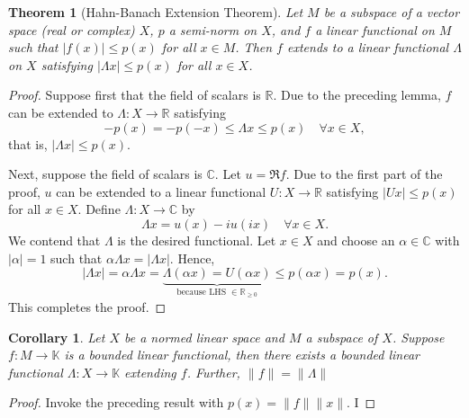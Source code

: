 \documentclass[11pt]{article}
\theoremstyle{thmstyle}
\newtheorem{theorem}{Theorem}[section]
\theoremstyle{defstyle}
\newtheorem*{corollary}{Corollary}
\newcommand{\R}{\mathbb{R}}
\newcommand{\bbC}{\mathbb{C}}
\newcommand{\K}{\mathbb{K}} %
\renewcommand{\le}{\leqslant}
\renewcommand{\ge}{\geqslant}
\begin{document}
\begin{theorem}[Hahn-Banach Extension Theorem]
    Let $M$ be a subspace of a vector space (real or complex) $X$, $p$ a semi-norm on $X$, and $f$ a linear functional on $M$ such that $|f(x)|\le p(x)$ for all $x\in M$. Then $f$ extends to a linear functional $\Lambda$ on $X$ satisfying $|\Lambda x|\le p(x)$ for all $x\in X$.
\end{theorem}
\begin{proof}
    Suppose first that the field of scalars is $\R$. Due to the preceding lemma, $f$ can be extended to $\Lambda: X\to\R$ satisfying 
    \begin{equation*}
        -p(x) = -p(-x)\le\Lambda x\le p(x)\quad\forall x\in X,
    \end{equation*}
    that is, $|\Lambda x|\le p(x)$.

    Next, suppose the field of scalars is $\bbC$. Let $u = \Re f$. Due to the first part of the proof, $u$ can be extended to a linear functional $U: X\to\R$ satisfying $|Ux|\le p(x)$ for all $x\in X$. Define $\Lambda: X\to\bbC$ by 
    \begin{equation*}
        \Lambda x = u(x) - iu(ix)\quad\forall x\in X.
    \end{equation*}
    We contend that $\Lambda$ is the desired functional. Let $x\in X$ and choose an $\alpha\in\bbC$ with $|\alpha| = 1$ such that $\alpha\Lambda x = |\Lambda x|$. Hence, 
    \begin{equation*}
        |\Lambda x| = \alpha\Lambda x = \underbrace{\Lambda(\alpha x) = U(\alpha x)}_{\text{because LHS }\in\R_{\ge 0}}\le p(\alpha x) = p(x).
    \end{equation*}
    This completes the proof.
\end{proof}

\begin{corollary}
    Let $X$ be a normed linear space and $M$ a subspace of $X$. Suppose $f: M\to\K$ is a bounded linear functional, then there exists a bounded linear functional $\Lambda: X\to \K$ extending $f$. Further, $\|f\| = \|\Lambda\|$
\end{corollary}
\begin{proof}
    Invoke the preceding result with $p(x) = \|f\|\|x\|$. I
\end{proof}
\end{document}

